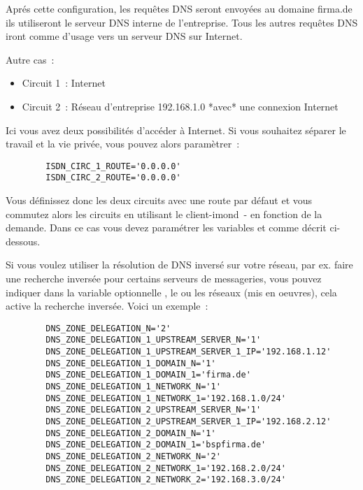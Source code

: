 \begin{description}
{      Aprés cette configuration, les requêtes DNS seront envoyées au domaine
      firma.de ils utiliseront le serveur DNS interne de l'entreprise. Tous les
      autres requêtes DNS iront comme d'usage vers un serveur DNS sur Internet.

      Autre cas~:

      \begin{itemize}
      \item Circuit 1~: Internet
      \item Circuit 2~: Réseau d'entreprise 192.168.1.0 *avec* une connexion Internet
      \end{itemize}

      Ici vous avez deux possibilités d'accéder à Internet. Si vous souhaitez
      séparer le travail et la vie privée, vous pouvez alors paramètrer~:

\begin{example}
\begin{verbatim}
        ISDN_CIRC_1_ROUTE='0.0.0.0'
        ISDN_CIRC_2_ROUTE='0.0.0.0'
\end{verbatim}
\end{example}

      Vous définissez donc les deux circuits avec une route par défaut et vous
      commutez alors les circuits en utilisant le client-imond~- en fonction
      de la demande. Dans ce cas vous devez paramétrer les variables
       et 
      comme décrit ci-dessous.}

      Si vous voulez utiliser la résolution de DNS inversé sur votre réseau,
      par ex. faire une recherche inversée pour certains serveurs de messageries,
      vous pouvez indiquer dans la variable optionnelle ,
      le ou les réseaux (mis en oeuvres), cela active la recherche inversée.
      Voici un exemple~:

\begin{example}
\begin{verbatim}
        DNS_ZONE_DELEGATION_N='2'
        DNS_ZONE_DELEGATION_1_UPSTREAM_SERVER_N='1'
        DNS_ZONE_DELEGATION_1_UPSTREAM_SERVER_1_IP='192.168.1.12'
        DNS_ZONE_DELEGATION_1_DOMAIN_N='1'
        DNS_ZONE_DELEGATION_1_DOMAIN_1='firma.de'
        DNS_ZONE_DELEGATION_1_NETWORK_N='1'
        DNS_ZONE_DELEGATION_1_NETWORK_1='192.168.1.0/24'
        DNS_ZONE_DELEGATION_2_UPSTREAM_SERVER_N='1'
        DNS_ZONE_DELEGATION_2_UPSTREAM_SERVER_1_IP='192.168.2.12'
        DNS_ZONE_DELEGATION_2_DOMAIN_N='1'
        DNS_ZONE_DELEGATION_2_DOMAIN_1='bspfirma.de'
        DNS_ZONE_DELEGATION_2_NETWORK_N='2'
        DNS_ZONE_DELEGATION_2_NETWORK_1='192.168.2.0/24'
        DNS_ZONE_DELEGATION_2_NETWORK_2='192.168.3.0/24'
\end{verbatim}
\end{example}


\end{description}
